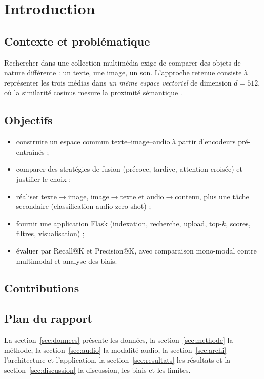 \section{Introduction}
\subsection{Contexte et problématique}
Rechercher dans une collection multimédia exige de comparer des objets de nature différente : un texte, une image,
un son. L'approche retenue consiste à représenter les trois médias dans \emph{un même espace vectoriel} de
dimension $d=512$, où la similarité cosinus mesure la proximité sémantique \cite{radford2021clip,girdhar2023imagebind}.

\subsection{Objectifs}
\begin{itemize}[noitemsep]
  \item construire un espace commun texte--image--audio à partir d'encodeurs pré-entraînés ;
  \item comparer des stratégies de fusion (précoce, tardive, attention croisée) et justifier le choix ;
  \item réaliser texte$\to$image, image$\to$texte et audio$\to$contenu, plus une tâche secondaire (classification
        audio zero-shot) ;
  \item fournir une application Flask (indexation, recherche, upload, top-$k$, scores, filtres, visualisation) ;
  \item évaluer par Recall@K et Precision@K, avec comparaison mono-modal contre multimodal et analyse des biais.
\end{itemize}

\subsection{Contributions}

\subsection{Plan du rapport}
La section~\ref{sec:donnees} présente les données, la section~\ref{sec:methode} la méthode, la
section~\ref{sec:audio} la modalité audio, la section~\ref{sec:archi} l'architecture et l'application, la
section~\ref{sec:resultats} les résultats et la section~\ref{sec:discussion} la discussion, les biais et les limites.
